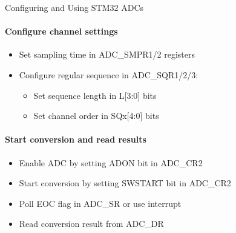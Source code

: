 \begin{KR}{Configuring and Using STM32 ADCs}
\paragraph{Configure channel settings}
\begin{itemize}
    \item Set sampling time in ADC\_SMPR1/2 registers
    \item Configure regular sequence in ADC\_SQR1/2/3:
    \begin{itemize}
        \item Set sequence length in L[3:0] bits
        \item Set channel order in SQx[4:0] bits
    \end{itemize}
\end{itemize}

\paragraph{Start conversion and read results}
\begin{itemize}
    \item Enable ADC by setting ADON bit in ADC\_CR2
    \item Start conversion by setting SWSTART bit in ADC\_CR2
    \item Poll EOC flag in ADC\_SR or use interrupt
    \item Read conversion result from ADC\_DR
\end{itemize}
\end{KR}

